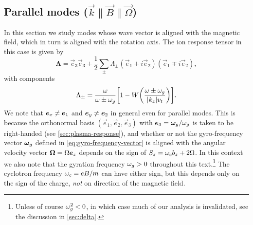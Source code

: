 \documentclass[aps,pre,notitlepage,amsmath,amssymb,amsfonts,nobibnotes,nofootinbib]{revtex4-1}
\begin{document}
\subsection{Parallel modes
  ($\vec{k}\bm{\parallel}\vec{B}\bm{\parallel}\vec{\Omega}$)}
\label{sec:par}

In this section we study modes whose wave vector is aligned with the magnetic
field, which in turn is aligned with the rotation axis. The ion response
tensor in this case is given by
\begin{equation}
  \label{eq:parallel-response}
  \mathbf{\Lambda} =
  \vec{e}_3\vec{e}_3 + \frac{1}{2}\sum_\pm\Lambda^{}_\pm
  (\vec{e}_1\pm i\vec{e}_2)(\vec{e}_1\mp i\vec{e}_2),
\end{equation}
with components
\begin{equation}
  \label{eq:circular-components}
  \Lambda_\pm = \frac{\omega}{\omega\pm\omg}
  \left[1 - W\left(\frac{\omega\pm\omg}{|k_z|\vt}\right)\right].
\end{equation}
We note that $\bm{e}_x\ne\bm{e}_1$ and $\bm{e}_y\ne\bm{e}_2$ in general even for
parallel modes. This is because the orthonormal basis
$(\vec{e}_1,\vec{e}_2,\vec{e}_3)$ with $\bm{e}_3=\bm{\omega}_g/\omega_g$ is taken to be
right-handed (see \cref{sec:plasma-response}), and whether or not the
gyro-frequency vector $\bm{\omega}_g$ defined in \cref{eq:gyro-frequency-vector} is
aligned with the angular velocity vector $\bm{\Omega}=\Omega\bm{e}_z$ depends on
the sign of $S_z=\omega_c{}b_z+2\Omega$. In this context we also note that the
gyration frequency $\omega_g>0$ throughout this text.\footnote{Unless of course
  $\omega_g^2<0$, in which case much of our analysis is invalidated, see the
  discussion in \cref{sec:delta}.} The cyclotron frequency $\omega_c=eB/m$ can
have either sign, but this depends only on the sign of the charge, \emph{not}
on direction of the magnetic field.
\end{document}
